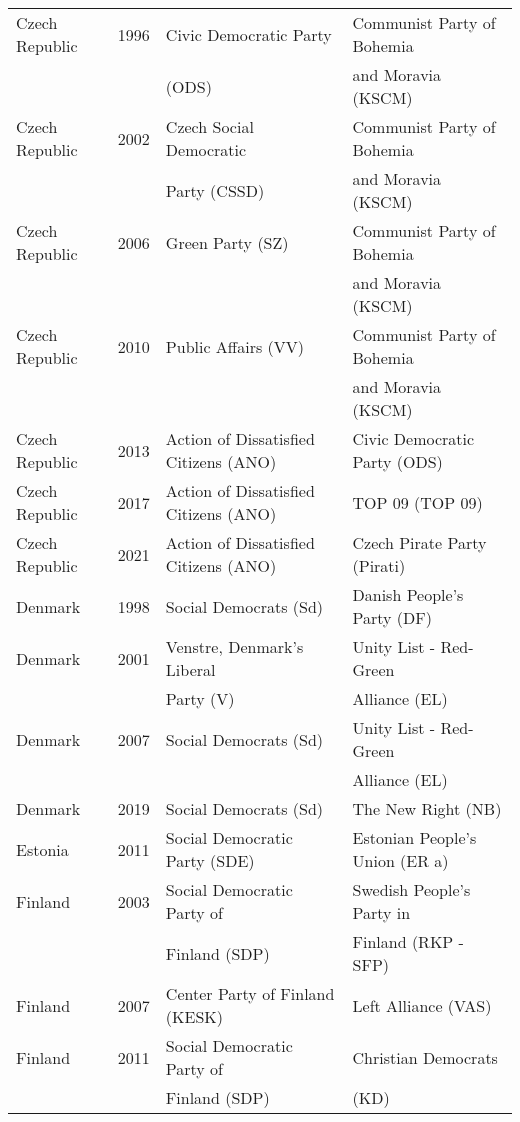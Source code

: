 {\begin{longtable}{|l|c|l|l|}
%
Czech Republic & 1996 &   Civic Democratic Party   &   Communist Party of Bohemia   \\ 
                 &   &     (ODS) &     and Moravia (KSCM) \\ 
Czech Republic  & 2002 &   Czech Social Democratic  &   Communist Party of Bohemia  \\ 
   &   &   Party (CSSD) & and Moravia (KSCM) \\ 
Czech Republic & 2006 &   Green Party (SZ) &   Communist Party of Bohemia   \\ 
                 &   &     &  and Moravia (KSCM) \\ 
Czech Republic  & 2010 &   Public Affairs (VV) &   Communist Party of Bohemia   \\ 
   &  &  & and Moravia (KSCM) \\ 
Czech Republic  & 2013 &   Action of Dissatisfied Citizens (ANO)   &   Civic Democratic Party (ODS)   \\
Czech Republic   & 2017 &   Action of Dissatisfied Citizens (ANO)  &   TOP 09 (TOP 09) \\ 
Czech Republic & 2021 &   Action of Dissatisfied Citizens (ANO)   &   Czech Pirate Party (Pirati)  \\ 
%
Denmark & 1998 &   Social Democrats (Sd) &   Danish People's Party (DF) \\ 
Denmark & 2001 &   Venstre, Denmark's Liberal &   Unity List - Red-Green  \\ 
  &  &    Party (V) &     Alliance (EL) \\ 
Denmark & 2007 &   Social Democrats (Sd) &   Unity List - Red-Green   \\ 
    &       &     &     Alliance (EL) \\ 
Denmark & 2019 &   Social Democrats (Sd) &   The New Right (NB) \\ 
%
Estonia & 2011 &        Social Democratic Party (SDE) &   Estonian People's Union (ER a)  \\ 
  Finland & 2003 &        Social Democratic Party of &   Swedish People's Party in   \\ 
           &   &          Finland (SDP) &   Finland (RKP - SFP) \\ 
  Finland & 2007 &   Center Party of Finland (KESK) &   Left Alliance (VAS) \\ 
  Finland & 2011 &        Social  Democratic Party of   &   Christian Democrats   \\ 
         &       &         Finland (SDP) &     (KD) \\ 

\end{longtable}}
